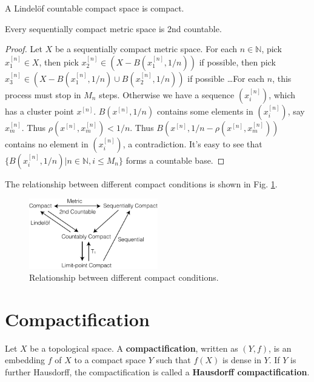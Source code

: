 \documentclass[12pt]{book}
\begin{document}
\begin{theorem}
	A Lindel\"of countable compact space is compact.
\end{theorem}

\begin{lemma}
	Every sequentially compact metric space is 2nd countable.
\end{lemma}
\begin{proof}
	Let $X$ be a sequentially compact metric space. For each $n\in \mathbb N$, pick $x_1^{[n]}\in X$, then pick $x_2^{[n]}\in (X-B(x_1^{[n]},1/n))$ if possible, then pick $x_3^{[n]}\in (X-B(x_1^{[n]},1/n)\cup B(x_2^{[n]},1/n))$ if possible \dots For each $n$, this process must stop in $M_n$ steps. Otherwise we have a sequence $(x_i^{[n]})$, which has a cluster point $x^{[n]}$. $B(x^{[n]},1/n)$ contains some elements in $(x_i^{[n]})$, say $x_m^{[n]}$. Thus $\rho(x^{[n]},x_m^{[n]})<1/n$. Thus $B(x^{[n]},1/n-\rho(x^{[n]},x_m^{[n]}))$ contains no element in $(x_i^{[n]})$, a contradiction. It's easy to see that $\{B(x_i^{[n]},1/n)|n\in\mathbb N,i\leq M_n\}$ forms a countable base.
\end{proof}

The relationship between different compact conditions is shown in Fig. \ref{fig:compact_relation}.

\begin{figure}[htb!]
	\centering  
	\includegraphics[width=0.5\textwidth ]{resources/chap_compact/compactness.pdf}  
	\caption{Relationship between different compact conditions.}
	\label{fig:compact_relation}
\end{figure}

\section{Compactification}

\begin{definition}
	Let $X$ be a topological space. A {\bf compactification}, written as $(Y,f)$, is an embedding $f$ of $X$ to a compact space $Y$ such that $f(X)$ is dense in $Y$. If $Y$ is further Hausdorff, the compactification is called a {\bf Hausdorff compactification}.
\end{definition}
\end{document}
